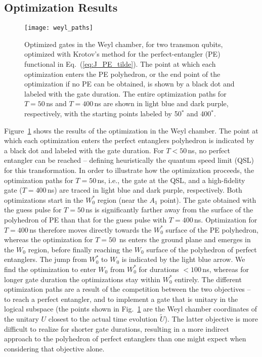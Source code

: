 \subsection{Optimization Results}


\begin{figure}[tb]
  \centering
  \texttt{[image: weyl\_paths]}
  \caption{Optimized gates in the Weyl chamber, for two transmon qubits,
  optimized with Krotov's method for the perfect-entangler (PE) functional in
  Eq.~(\ref{eq:J_PE_tilde}).
  The point at which each optimization enters the PE polyhedron, or the
  end point of the optimization if no PE can be obtained,
  is shown by a black dot and labeled with the gate duration.
  The entire optimization paths for  $T=50\,$ns and $T=400\,$ns are
  shown in light blue and dark purple, respectively, with the
  starting points labeled by 50$^*$ and 400$^*$.}
  \label{fig:transmon_weyl_paths}
\end{figure}
Figure~\ref{fig:transmon_weyl_paths} shows the results of the
optimization in the Weyl chamber. The point at which each optimization
enters the perfect entanglers
polyhedron is indicated by a black dot and labeled
with the gate duration. For $T<50\,$ns, no perfect entangler can be
reached -- defining heuristically the quantum speed limit (QSL) for this
transformation.
%
In order to illustrate how the optimization proceeds,
the optimization paths for $T=50\,$ns, i.e., the gate at the
QSL, and a high-fidelity gate ($T=400\,$ns) are traced in light blue
and dark purple, respectively. Both optimizations start
in the $W_0^*$ region (near the $A_1$ point). The gate obtained with
the guess pulse for
$T=50\,$ns is significantly farther away from the surface of the
polyhedron of PE than that for the guess pulse with $T=400\,$ns.
Optimization for $T=400\,$ns therefore
moves directly towards the $W_0^*$ surface of the
PE polyhedron, whereas the optimization for $T=50$~ns enters the
ground plane and emerges in the $W_0$ region, before finally
reaching the $W_0$ surface of the polyhedron of perfect entanglers. The jump
from $W_0^*$ to $W_0$ is indicated by the light blue arrow. We find
the optimization to enter $W_0$ from $W_0^*$ for
durations $< 100\,$ns,  whereas for longer gate duration the optimizations
stay within $W_0^*$ entirely. The different optimization paths are a
result of the competition between the two objectives -- to reach a
perfect entangler, and to implement a gate that is unitary in the
logical subspace (the points shown in
Fig.~\ref{fig:transmon_weyl_paths} are the Weyl chamber
coordinates of the unitary $U$ closest to the actual time evolution
$\tilde{U}$). The latter objective is more difficult to realize
for shorter gate durations, resulting in a more indirect approach to
the polyhedron of perfect entanglers than one might expect when
considering that objective alone.


